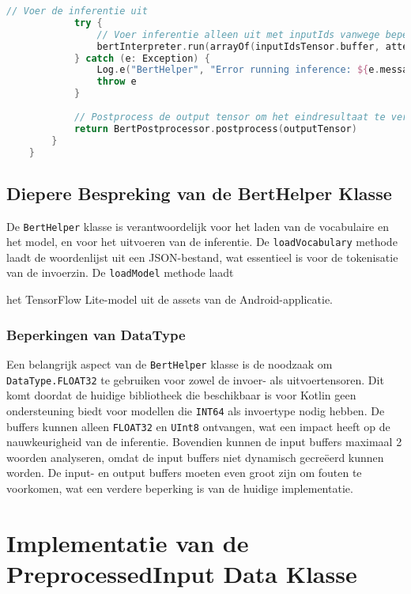 \begin{lstlisting}[language=Kotlin, caption={Implementatie van BertHelper}]
            // Voer de inferentie uit
            try {
                // Voer inferentie alleen uit met inputIds vanwege beperkingen van de bibliotheek
                bertInterpreter.run(arrayOf(inputIdsTensor.buffer, attentionMaskTensor.buffer), outputTensor.buffer)
            } catch (e: Exception) {
                Log.e("BertHelper", "Error running inference: ${e.message}")
                throw e
            }
            
            // Postprocess de output tensor om het eindresultaat te verkrijgen
            return BertPostprocessor.postprocess(outputTensor)
        }
    }
\end{lstlisting}

\subsection{Diepere Bespreking van de BertHelper Klasse}

De \texttt{BertHelper} klasse is verantwoordelijk voor het laden van de vocabulaire en het model, en voor het uitvoeren van de inferentie. De \texttt{loadVocabulary} methode laadt de woordenlijst uit een JSON-bestand, wat essentieel is voor de tokenisatie van de invoerzin. De \texttt{loadModel} methode laadt

het TensorFlow Lite-model uit de assets van de Android-applicatie.

\subsubsection{Beperkingen van DataType}

Een belangrijk aspect van de \texttt{BertHelper} klasse is de noodzaak om \texttt{DataType.FLOAT32} te gebruiken voor zowel de invoer- als uitvoertensoren. Dit komt doordat de huidige bibliotheek die beschikbaar is voor Kotlin geen ondersteuning biedt voor modellen die \texttt{INT64} als invoertype nodig hebben. De buffers kunnen alleen \texttt{FLOAT32} en \texttt{UInt8} ontvangen, wat een impact heeft op de nauwkeurigheid van de inferentie. Bovendien kunnen de input buffers maximaal 2 woorden analyseren, omdat de input buffers niet dynamisch gecreëerd kunnen worden. De input- en output buffers moeten even groot zijn om fouten te voorkomen, wat een verdere beperking is van de huidige implementatie.

\section{Implementatie van de PreprocessedInput Data Klasse}

